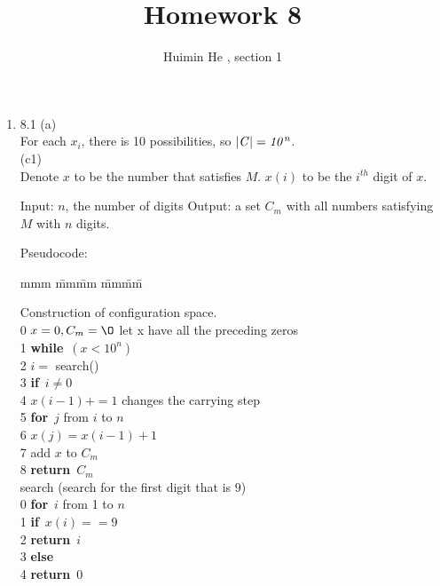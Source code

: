 \documentclass[11pt]{article}
\title{Homework 8}
\author{Huimin He , section 1}
\begin{document}
\maketitle

\def\bfor{\textbf{for}}
\def\bdo{\textbf{do}}
\def\bwhile{\textbf{while}}
\def\bend{\textbf{end}}
\def\bif{\textbf{if}}
\def\bthen{\textbf{then}}
\def\belse{\textbf{else}}
\def\breturn{\textbf{return}}
\def\bexit{\textbf{exit}}
\def\bprint{\textbf{print}}


\begin{enumerate}


\item 8.1 (a)\\
For each $x_i$, there is 10 possibilities, so $|\it{C}| = 10^n$.\\

(c1)\\

Denote $x$ to be the number that satisfies $M$. $x(i)$ to be the $i^{th}$ digit of $x$.

Input: $n$, the number of digits
Output: a set $C_m$ with all numbers satisfying $M$ with $n$ digits.

Pseudocode:
\begin{tabbing}
mmm \= mm\= mm \= mm\= mm\= \kill

Construction of configuration space.\\
0 \> $x=0,C_m =\O$ let x have all the preceding zeros\\  
1 \> \bwhile\ $(x<10^n)$\\
2 \> \> $i =$ search()\\
3 \> \> \bif\ $i \neq 0$ \\
4 \> \> \> $x(i-1) += 1$          changes the carrying step\\
5 \> \> \> \bfor\ $j$ from $i$ to $n$\\
6 \> \> \> \> $x(j) = x(i-1) + 1$\\
7 \> \> add $x$ to $C_m$\\
8 \> \breturn\ $C_m$\\

search (search for the first digit that is $9$)\\
0 \> \bfor\ $i$ from 1 to $n$\\
1 \> \> \bif\ $x(i) == 9$\\
2 \> \> \> \breturn\ $i$\\
3 \> \> \belse\ \\
4 \> \> \> \breturn\ $0$\\



\end{tabbing}
\end{enumerate}
\end{document}

